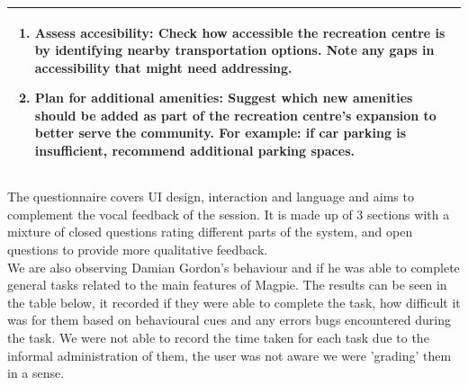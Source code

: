\begin{table}[h!]
\begin{tabular}{|p{}|}
\begin{enumerate}
            \item \textbf{Assess accesibility:} Check how accessible the recreation centre is by identifying nearby transportation options. Note any gaps in accessibility that might need addressing.
            \item \textbf{Plan for additional amenities:} Suggest which new amenities should be added as part of the recreation centre's expansion to better serve the community. For example: if car parking is insufficient, recommend additional parking spaces.
        \end{enumerate}                                             \\
        \hline
    \end{tabular}
\end{table}

\noindent The questionnaire covers UI design, interaction and language and aims to complement the vocal feedback of the session. It is made up of 3 sections with a mixture of closed questions rating different parts of the system, and open questions to provide more qualitative feedback.\\

\noindent We are also observing Damian Gordon's behaviour and if he was able to complete general tasks related to the main features of Magpie. The results can be seen in the table below, it recorded if they were able to complete the task, how difficult it was for them based on behavioural cues and any errors bugs encountered during the task. We were not able to record the time taken for each task due to the informal administration of them, the user was not aware we were 'grading' them in a sense.\\

